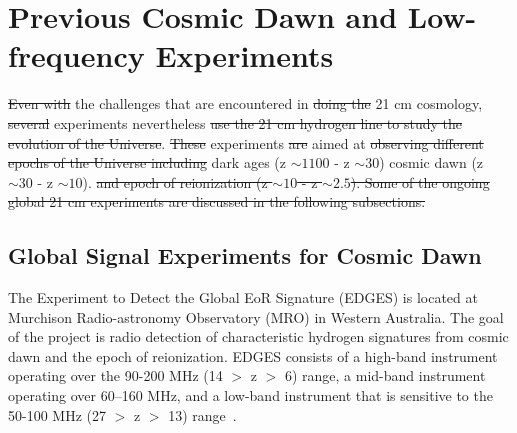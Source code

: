 	    \section{Previous Cosmic Dawn and Low-frequency Experiments}
	    
	    \st{Even with}  the challenges that are encountered in \st{doing the} 21 cm cosmology, \st{several}  experiments  nevertheless  \st{use the 21 cm hydrogen line to study the evolution of the Universe}.  \st{These} experiments \st{are} aimed at \st{observing different epochs of the Universe including}  dark ages (z $\sim1100$ - z $\sim30$)  cosmic dawn (z $\sim30$ - z $\sim10$). \st{and epoch of reionization (z $\sim10$ - z $\sim2.5$). Some of the ongoing global 21 cm experiments are discussed in the following subsections.} \\
	    
	    
	    \subsection{Global Signal Experiments for Cosmic Dawn}

            
	    The Experiment to Detect the Global EoR Signature (EDGES) is located at Murchison Radio-astronomy Observatory (MRO) in Western Australia. The goal of the project is radio detection of characteristic hydrogen signatures from cosmic dawn and the epoch of reionization. EDGES consists of a high-band instrument operating over the 90-200 MHz (14 $>$ z $>$ 6) range, a mid-band instrument operating over 60–160 MHz, and a low-band instrument that is sensitive to the 50-100 MHz (27 $>$ z $>$ 13) range~\cite{2017ApJ...835...49M}.  \\

